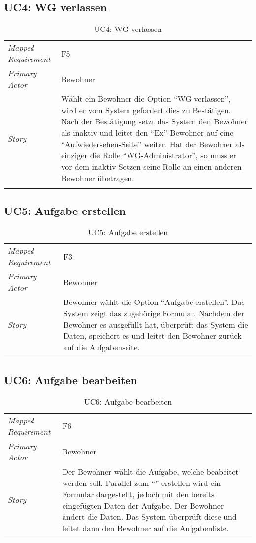 \subsection{UC4: WG verlassen}\label{subsec:uc4}
\begin{table}[H]
	\tablestyle
	\tablealtcolored
	\begin{tabularx}{\textwidth}{lX}
		\tablebody
			\textit{Mapped Requirement} &
			F5
			\tabularnewline
			\textit{Primary Actor} &
			Bewohner
			\tabularnewline
			\textit{Story} &
			Wählt ein Bewohner die Option ``WG verlassen'', wird er vom System gefordert dies zu Bestätigen. Nach der Bestätigung setzt das System den Bewohner als inaktiv und leitet den ``Ex''-Bewohner auf eine ``Aufwiedersehen-Seite'' weiter. \newline
			Hat der Bewohner als einziger die Rolle ``WG-Administrator'', so muss er vor dem inaktiv Setzen seine Rolle an einen anderen Bewohner übetragen.
			\tabularnewline
		\tableend
	\end{tabularx}
	\caption{UC4: WG verlassen}
\end{table}


\subsection{UC5: Aufgabe erstellen}\label{subsec:uc5}
\begin{table}[H]
	\tablestyle
	\tablealtcolored
	\begin{tabularx}{\textwidth}{lX}
		\tablebody
			\textit{Mapped Requirement} &
			F3
			\tabularnewline
			\textit{Primary Actor} &
			Bewohner
			\tabularnewline
			\textit{Story} &
			Bewohner wählt die Option ``Aufgabe erstellen''. Das System zeigt das zugehörige Formular. Nachdem der Bewohner es ausgefüllt hat, überprüft das System die Daten, speichert es und leitet den Bewohner zurück auf die Aufgabenseite.
			\tabularnewline
		\tableend
	\end{tabularx}
	\caption{UC5: Aufgabe erstellen}
\end{table}


\subsection{UC6: Aufgabe bearbeiten}\label{subsec:uc6}
\begin{table}[H]
	\tablestyle
	\tablealtcolored
	\begin{tabularx}{\textwidth}{lX}
		\tablebody
			\textit{Mapped Requirement} &
			F6
			\tabularnewline
			\textit{Primary Actor} &
			Bewohner
			\tabularnewline
			\textit{Story} &
			Der Bewohner wählt die Aufgabe, welche beabeitet werden soll. Parallel zum ``\nameref{subsec:uc5}'' erstellen wird ein Formular dargestellt, jedoch mit den bereits eingefügten Daten der Aufgabe. Der Bewohner ändert die Daten. Das System überprüft diese und leitet dann den Bewohner auf die Aufgabenliste.
			\tabularnewline
		\tableend
	\end{tabularx}
	\caption{UC6: Aufgabe bearbeiten}
\end{table}


